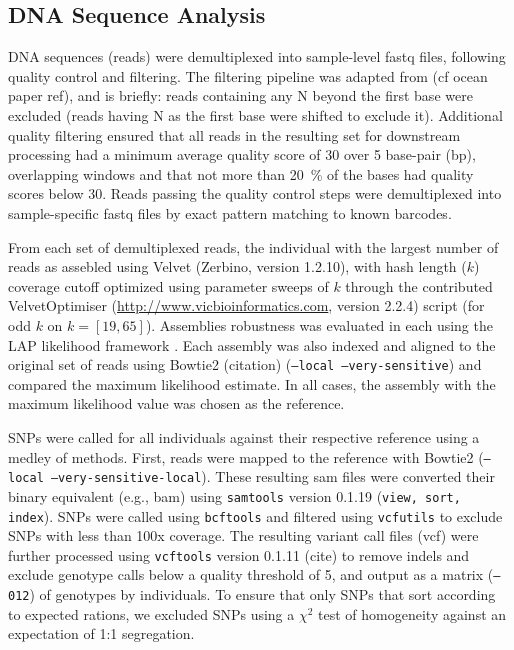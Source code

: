 \documentclass[11pt]{article}
\begin{document}
\subsection*{DNA Sequence Analysis}

DNA sequences (reads) were demultiplexed into sample-level fastq files, following quality control 
and filtering.  The filtering pipeline was adapted from (cf ocean paper ref), and is briefly: reads 
containing any N beyond the first base were excluded (reads having N as the first base were shifted 
to exclude it).  Additional quality filtering ensured that all reads in the resulting set for downstream 
processing had a minimum average quality score of 30 over 5 base-pair (bp), overlapping windows 
and that not more than \SI{20}{\percent} of the bases had quality scores below 30. Reads passing the 
quality control steps were demultiplexed into sample-specific fastq files by exact pattern matching to 
known barcodes.

From each set of demultiplexed reads, the individual with the largest number of reads as assebled using 
Velvet (Zerbino, version 1.2.10), with hash length ($k$) coverage cutoff optimized using parameter sweeps of $k$ 
through the contributed VelvetOptimiser (\url{http://www.vicbioinformatics.com}, version 2.2.4) 
script (for odd $k$ on $k=[19,65]$).  Assemblies robustness was evaluated in each using the LAP likelihood 
framework \citep{Ghodsi:2013bc}.  Each assembly was also indexed and aligned to the original set of reads 
using Bowtie2 (citation) (\texttt{--local --very-sensitive}) and compared the maximum likelihood estimate. 
In all cases, the assembly with the maximum likelihood value was chosen as the reference.

SNPs were called for all individuals against their respective reference using a medley of methods.  First, 
reads were mapped to the reference with Bowtie2 (\texttt{--local --very-sensitive-local}).  These resulting 
sam files were converted their binary equivalent (e.g., bam) using \texttt{samtools} version 0.1.19 
(\texttt{view, sort, index}).  SNPs were called using \texttt{bcftools} and filtered using 
\texttt{vcfutils} to exclude SNPs with less than 100x coverage. The resulting variant call files (vcf) 
were further processed using \texttt{vcftools} version 0.1.11 (cite) to remove indels and exclude genotype 
calls below a quality threshold of 5, and output as a matrix (\texttt{--012}) of genotypes by individuals.  
To ensure that only SNPs that sort according to expected rations, we excluded SNPs using a $\chi^2$ test of 
homogeneity against an expectation of 1:1 segregation.
\end{document}
